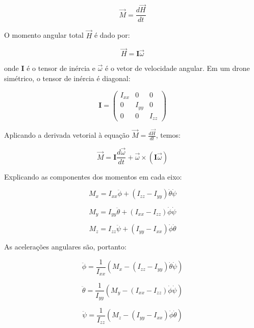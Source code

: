 \[
\vec{M} = \frac{d\vec{H}}{dt}
\tag{12}
\]

O momento angular total \(\vec{H}\) é dado por:

\[
\vec{H} = \mathbf{I} \vec{\omega}
\tag{13}
\]

onde \(\mathbf{I}\) é o tensor de inércia e \(\vec{\omega}\) é o vetor de velocidade angular. Em um drone simétrico, o tensor de inércia é diagonal:

\[
\mathbf{I} = \begin{pmatrix}
I_{xx} & 0 & 0 \\
0 & I_{yy} & 0 \\
0 & 0 & I_{zz}
\end{pmatrix}
\tag{14}
\]

Aplicando a derivada vetorial à equação \(\vec{M} = \frac{d\vec{H}}{dt}\), temos:

\[
\vec{M} = \mathbf{I} \frac{d\vec{\omega}}{dt} + \vec{\omega} \times (\mathbf{I} \vec{\omega})
\tag{15}
\]

Explicando as componentes dos momentos em cada eixo:

\[
M_x = I_{xx} \ddot{\phi} + (I_{zz} - I_{yy}) \dot{\theta} \dot{\psi}
\tag{16}
\]

\[
M_y = I_{yy} \ddot{\theta} + (I_{xx} - I_{zz}) \dot{\phi} \dot{\psi}
\tag{17}
\]

\[
M_z = I_{zz} \ddot{\psi} + (I_{yy} - I_{xx}) \dot{\phi} \dot{\theta}
\tag{18}
\]

As acelerações angulares são, portanto:

\[
\ddot{\phi} = \frac{1}{I_{xx}} \left( M_x - (I_{zz} - I_{yy}) \dot{\theta} \dot{\psi} \right)
\tag{19}
\]

\[
\ddot{\theta} = \frac{1}{I_{yy}} \left( M_y - (I_{xx} - I_{zz}) \dot{\phi} \dot{\psi} \right)
\tag{20}
\]

\[
\ddot{\psi} = \frac{1}{I_{zz}} \left( M_z - (I_{yy} - I_{xx}) \dot{\phi} \dot{\theta} \right)
\tag{21}
\]
